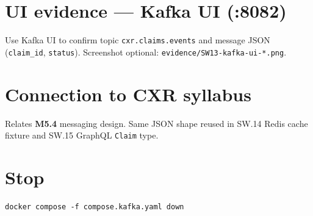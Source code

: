 \documentclass[11pt,a4paper]{report}
\begin{document}
\chapter{UI evidence --- Kafka UI (:8082)}

Use Kafka UI to confirm topic \texttt{cxr.claims.events} and message JSON (\texttt{claim\_id}, \texttt{status}).
Screenshot optional: \texttt{evidence/SW13-kafka-ui-*.png}.

\chapter{Connection to CXR syllabus}

Relates \textbf{M5.4} messaging design. Same JSON shape reused in SW.14 Redis cache fixture and SW.15 GraphQL \texttt{Claim} type.

\chapter{Stop}

\begin{lstlisting}[style=bash]
docker compose -f compose.kafka.yaml down
\end{lstlisting}
\end{document}

